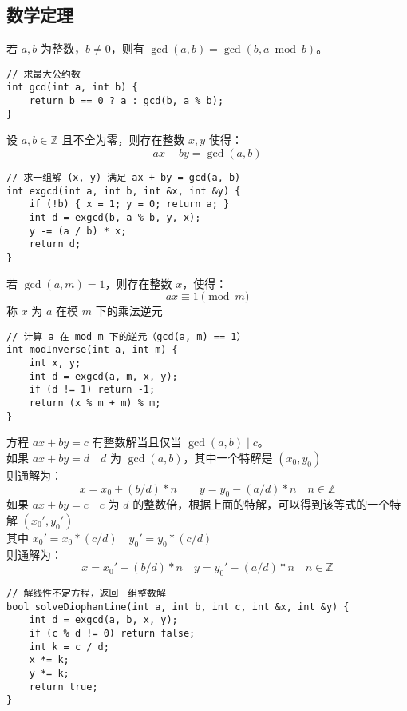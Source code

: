 \subsection{数学定理}

\begin{theorem}[欧几里得]
若 $a, b$ 为整数，$b \ne 0$，则有 $\gcd(a, b) = \gcd(b, a \bmod b)$。
\end{theorem}
\begin{lstlisting}
// 求最大公约数
int gcd(int a, int b) {
    return b == 0 ? a : gcd(b, a % b);
}
\end{lstlisting}

\begin{theorem}[扩展欧几里得]
设 $a, b \in \mathbb{Z}$ 且不全为零，则存在整数 $x, y$ 使得：
\[
ax + by = \gcd(a, b)
\]
\end{theorem}
\begin{lstlisting}
// 求一组解 (x, y) 满足 ax + by = gcd(a, b)
int exgcd(int a, int b, int &x, int &y) {
    if (!b) { x = 1; y = 0; return a; }
    int d = exgcd(b, a % b, y, x);
    y -= (a / b) * x;
    return d;
}
\end{lstlisting}


\begin{theorem}[模逆元]
若 $\gcd(a, m) = 1$，则存在整数 $x$，使得：
\[
ax \equiv 1 \pmod{m}
\]
称 $x$ 为 $a$ 在模 $m$ 下的乘法逆元
\end{theorem}
\begin{lstlisting}
// 计算 a 在 mod m 下的逆元（gcd(a, m) == 1）
int modInverse(int a, int m) {
    int x, y;
    int d = exgcd(a, m, x, y);
    if (d != 1) return -1;
    return (x % m + m) % m;
}
\end{lstlisting}

\begin{theorem}[线性不定方程求解]
方程 $ax + by = c$ 有整数解当且仅当 $\gcd(a, b) \mid c$。 \\
如果 $ax + by = d \quad d$ 为 $\gcd(a, b)$，其中一个特解是 $(x_0, y_0)$ \\
则通解为：
\[
x = x_0 + (b / d) \ast n \qquad y = y_0 - (a / d) \ast n \quad n \in \mathbb{Z}
\]
如果 $ax + by = c \quad c$ 为 $d$ 的整数倍，根据上面的特解，可以得到该等式的一个特解 $(x_0', y_0')$ \\
其中 $x_0' = x_0 \ast (c / d) \quad y_0' = y_0 \ast (c / d)$ \\
则通解为：
\[
x = x_0' + (b / d) \ast n \quad y = y_0' - (a / d) \ast n \quad n \in \mathbb{Z}
\]
\end{theorem}
\begin{lstlisting}
// 解线性不定方程，返回一组整数解
bool solveDiophantine(int a, int b, int c, int &x, int &y) {
    int d = exgcd(a, b, x, y);
    if (c % d != 0) return false;
    int k = c / d;
    x *= k;
    y *= k;
    return true;
}
\end{lstlisting}


